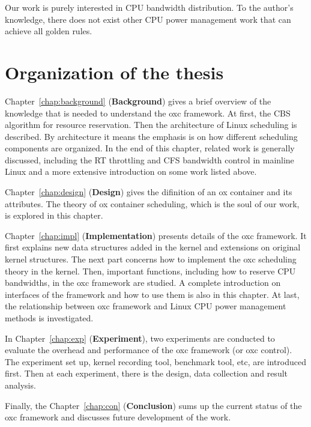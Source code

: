Our work is purely interested in CPU bandwidth distribution.
To the author's knowledge, there does not exist other 
CPU power management work that can achieve all golden rules.

%
\section{Organization of the thesis}
Chapter~\ref{chap:background} ({\bf Background}) gives a brief overview
of the knowledge that is needed to understand the oxc framework. At first,
the CBS algorithm for resource reservation. Then the architecture of 
Linux scheduling is described. By architecture it means the emphasis is 
on how different scheduling components are organized. In the end of this
chapter, related work is generally discussed, including the RT throttling
and CFS bandwidth control in mainline Linux and a more extensive 
introduction on some work listed above.

Chapter~\ref{chap:design} ({\bf Design}) gives the difinition of an ox 
container and its attributes. The theory of ox container scheduling, which
is the soul of our work, is explored in this chapter. 

Chapter~\ref{chap:impl} ({\bf Implementation}) presents details of the oxc
framework. It first explains new data structures added in the kernel and 
extensions on original kernel structures. The next part concerns how to 
implement the oxc scheduling theory in the kernel. Then, important functions,
including how to reserve CPU bandwidths, in the oxc framework are studied.
A complete introduction on interfaces of the framework and how to use them
is also in this chapter. At last, the relationship between oxc framework
and Linux CPU power management methods is investigated.

In Chapter~\ref{chap:exp} ({\bf Experiment}), two experiments are conducted
to evaluate the overhead and performance of the oxc framework (or oxc control).
The experiment set up, kernel recording tool, benchmark tool,
etc, are introduced first. Then at each experiment, there is the design, 
data collection and result analysis.

Finally, the Chapter~\ref{chap:con} ({\bf Conclusion}) sums up the current
status of the oxc framework and discusses future development of the work. 
%

